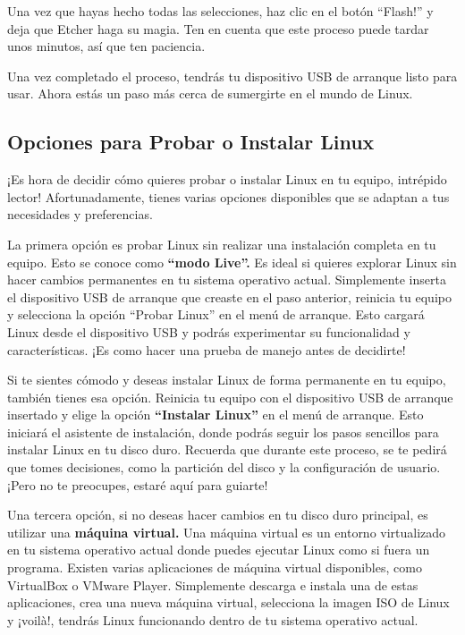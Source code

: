 \documentclass[
  jou,
  floatsintext,
  longtable,
  a4paper,
  nolmodern,
  notxfonts,
  notimes,
  12pt,
  colorlinks=true,linkcolor=blue,citecolor=blue,urlcolor=blue]{apa7}
\begin{document}
Una vez que hayas hecho todas las selecciones, haz clic en el botón
``Flash!'' y deja que Etcher haga su magia. Ten en cuenta que este
proceso puede tardar unos minutos, así que ten paciencia.

Una vez completado el proceso, tendrás tu dispositivo USB de arranque
listo para usar. Ahora estás un paso más cerca de sumergirte en el mundo
de Linux.

\subsection{Opciones para Probar o Instalar
Linux}\label{opciones-para-probar-o-instalar-linux}

¡Es hora de decidir cómo quieres probar o instalar Linux en tu equipo,
intrépido lector! Afortunadamente, tienes varias opciones disponibles
que se adaptan a tus necesidades y preferencias.

La primera opción es probar Linux sin realizar una instalación completa
en tu equipo. Esto se conoce como \textbf{``modo Live''.} Es ideal si
quieres explorar Linux sin hacer cambios permanentes en tu sistema
operativo actual. Simplemente inserta el dispositivo USB de arranque que
creaste en el paso anterior, reinicia tu equipo y selecciona la opción
``Probar Linux'' en el menú de arranque. Esto cargará Linux desde el
dispositivo USB y podrás experimentar su funcionalidad y
características. ¡Es como hacer una prueba de manejo antes de decidirte!

Si te sientes cómodo y deseas instalar Linux de forma permanente en tu
equipo, también tienes esa opción. Reinicia tu equipo con el dispositivo
USB de arranque insertado y elige la opción \textbf{``Instalar Linux''}
en el menú de arranque. Esto iniciará el asistente de instalación, donde
podrás seguir los pasos sencillos para instalar Linux en tu disco duro.
Recuerda que durante este proceso, se te pedirá que tomes decisiones,
como la partición del disco y la configuración de usuario. ¡Pero no te
preocupes, estaré aquí para guiarte!

Una tercera opción, si no deseas hacer cambios en tu disco duro
principal, es utilizar una \textbf{máquina virtual.} Una máquina virtual
es un entorno virtualizado en tu sistema operativo actual donde puedes
ejecutar Linux como si fuera un programa. Existen varias aplicaciones de
máquina virtual disponibles, como VirtualBox o VMware Player.
Simplemente descarga e instala una de estas aplicaciones, crea una nueva
máquina virtual, selecciona la imagen ISO de Linux y ¡voilà!, tendrás
Linux funcionando dentro de tu sistema operativo actual.
\end{document}
